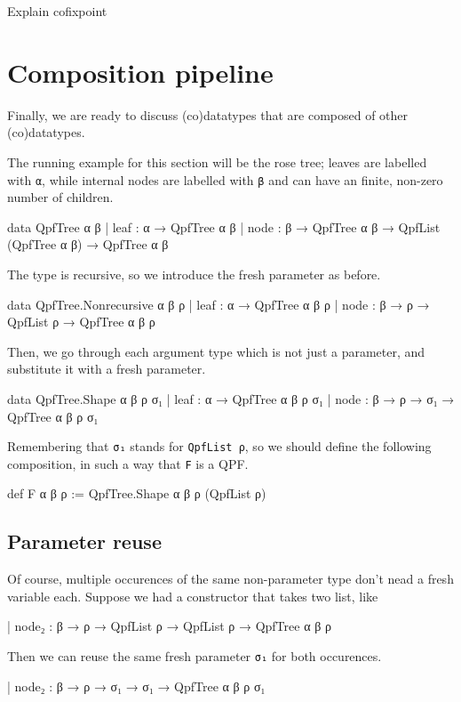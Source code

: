 \documentclass[titlepage]{report}
\newenvironment{todo}{\begin{shaded}\begin{trivlist}                         
    \item[\hskip \labelsep {\bfseries Todo:}]}{\end{trivlist}\end{shaded}}
\begin{document}
\begin{todo}
    Explain cofixpoint
\end{todo}



\section{Composition pipeline}
Finally, we are ready to discuss (co)datatypes that are composed of other (co)datatypes.

The running example for this section will be the rose tree; leaves are labelled with \texttt{α}, while
internal nodes are labelled with \texttt{β} and can have an finite, non-zero number of children.
\begin{leancode}
    data QpfTree α β
      | leaf : α → QpfTree α β
      | node : β → QpfTree α β → QpfList (QpfTree α β) → QpfTree α β
\end{leancode}

The type is recursive, so we introduce the fresh parameter as before.
\begin{leancode}
    data QpfTree.Nonrecursive α β ρ
      | leaf : α → QpfTree α β ρ
      | node : β → ρ → QpfList ρ → QpfTree α β ρ
\end{leancode}

Then, we go through each argument type which is not just a parameter, and substitute
it with a fresh parameter.

\begin{leancode}
    data QpfTree.Shape α β ρ σ₁
      | leaf : α → QpfTree α β ρ σ₁
      | node : β → ρ → σ₁ → QpfTree α β ρ σ₁
\end{leancode}
Remembering that \texttt{σ₁} stands for \texttt{QpfList ρ}, so we should define the following 
composition, in such a way that \texttt{F} is a QPF.
\begin{leancode}
    def F α β ρ := QpfTree.Shape α β ρ (QpfList ρ)
\end{leancode}


\subsection{Parameter reuse}
Of course, multiple occurences of the same non-parameter type don't nead a fresh variable each.
Suppose we had a constructor that takes two list, like
\begin{leancode}
    | node₂ : β → ρ → QpfList ρ → QpfList ρ → QpfTree α β ρ
\end{leancode}
Then we can reuse the same fresh parameter \texttt{σ₁} for both occurences.
\begin{leancode}
    | node₂ : β → ρ → σ₁ → σ₁ → QpfTree α β ρ σ₁
\end{leancode}
\end{document}
